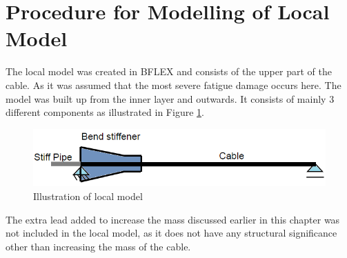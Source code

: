 \section{Procedure for Modelling of Local Model}
\label{sec:localmodel}
The local model was created in BFLEX and consists of the upper part of the cable. As it was assumed that the most severe fatigue damage occurs here.  The model was built up from the inner layer and outwards. It consists of mainly 3 different components as illustrated in Figure \ref{fig:localmod}.
\begin{figure}[H]
\centering
\includegraphics[scale=0.7]{figures/localmod.png}
\caption [$\; \:$Illustration of local model]{Illustration of local model}
 \label{fig:localmod}
\end{figure}
The extra lead added to increase the mass discussed earlier in this chapter was not included in the local model, as it does not have any structural significance other than increasing the mass of the cable.\newline
\newline
